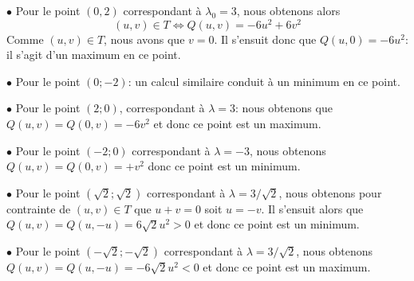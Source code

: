 {{$\bullet$ Pour le point $(0,2)$ correspondant à $\lambda_0=3$, nous obtenons alors 
$$ (u,v)\in T \Leftrightarrow Q(u,v)=-6u^2+6v^2$$
Comme $(u,v)\in T$, nous avons que $v=0$. Il s'ensuit donc que $Q(u,0)=-6u^2$: il s'agit d'un maximum en ce point. 


$\bullet$ Pour le point $(0;-2)$: un calcul similaire conduit à un minimum en ce point. 


$\bullet$ Pour le point $(2;0)$, correspondant à $\lambda =3$: nous obtenons que 
$Q(u,v)=Q(0,v)=-6v^2$ et donc ce point est un maximum. 


$\bullet$ Pour le point $(-2;0)$ correspondant à $\lambda =-3$, nous obtenons 
$Q(u,v)=Q(0,v)=+v^2$ donc ce point est un minimum. 


$\bullet$ Pour le point $(\sqrt{2};\sqrt{2})$ correspondant à $\lambda = 3/\sqrt{2}$, nous obtenons pour contrainte de $(u,v)\in T$ que $u+v=0$ soit $u=-v$.
Il s'ensuit alors que $Q(u,v)=Q(u,-u)=6\sqrt{2}u^2>0$ et donc ce point est un minimum.


$\bullet$ Pour le point $(-\sqrt{2};-\sqrt{2})$ correspondant à $\lambda = 3/\sqrt{2}$, nous obtenons 
$Q(u,v)=Q(u,-u)=-6\sqrt{2}u^2<0$ et donc ce point est un maximum. 


}
}
